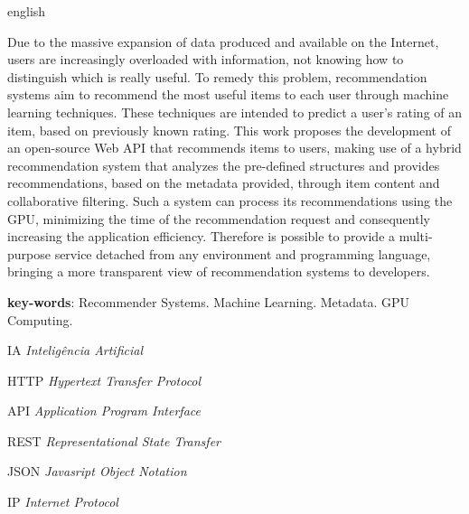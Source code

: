 \documentclass[12pt, openright, oneside, a4paper, brazil]{abntex2}
\begin{document}
\begin{resumo}[Abstract]
 \begin{otherlanguage*}{english}

Due to the massive expansion of data produced and available on the Internet, users are increasingly overloaded with information, not knowing how to distinguish which is really useful. To remedy this problem, recommendation systems aim to recommend the most useful items to each user through machine learning techniques. These techniques are intended to predict a user's rating of an item, based on previously known rating. This work proposes the development of an open-source Web API that recommends items to users, making use of a hybrid recommendation system that analyzes the pre-defined structures and provides recommendations, based on the metadata provided, through item content and collaborative filtering. Such a system can process its recommendations using the GPU, minimizing the time of the recommendation request and consequently increasing the application efficiency. Therefore is possible to provide a multi-purpose service detached from any environment and programming language, bringing a more transparent view of recommendation systems to developers.

  \textbf{key-words}: Recommender Systems. Machine Learning. Metadata. GPU Computing.
 \end{otherlanguage*}
\end{resumo}

\newpage %
\listofquadros* %
\cleardoublepage

\listoffigures*
\cleardoublepage

\begin{siglas}

	\item[IA]{\textit{Inteligência Artificial}}
	\item[HTTP]{\textit{Hypertext Transfer Protocol}}
	\item[API]{\textit{Application Program Interface}}
	\item[REST]{\textit{Representational State Transfer}}
	\item[JSON]{\textit{Javasript Object Notation}}
	\item[IP]\textit{Internet Protocol}

\end{siglas}
\end{document}
